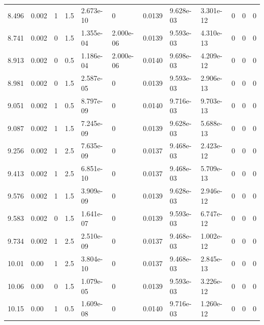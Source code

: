 \documentclass[preview]{standalone}
\begin{document}
{{{\begin{tabular}{L{1.2cm}C{1.2cm} C{0.3cm}C{0.5cm} C{1.4cm}C{1.4cm} C{1.4cm}C{1.4cm} C{1.6cm}C{1.6cm} C{1.6cm}C{1.6cm}}
  8.496  &  0.002  & 1     & 1.5 &  2.673e-10  & 0  &  0.0139&   9.628e-03& 3.301e-12 & 0   &  0 & 0  \\ 
  8.741  &  0.002  & 0     & 1.5 &  1.355e-04  & 2.000e-06  &  0.0139&   9.593e-03& 4.310e-13 & 0   &  0 & 0  \\ 
  8.913  &  0.002  & 0     & 0.5 &  1.186e-04  & 2.000e-06  &  0.0140&   9.698e-03& 4.209e-12 & 0   &  0 & 0  \\ 
  8.981  &  0.002  & 0     & 1.5 &  2.587e-05  & 0  &  0.0139&   9.593e-03& 2.906e-13 & 0   &  0 & 0  \\ 
  9.051  &  0.002  & 1     & 0.5 &  8.797e-09  & 0  &  0.0140&   9.716e-03& 9.703e-13 & 0   &  0 & 0  \\ 
  9.087  &  0.002  & 1     & 1.5 &  7.245e-09  & 0  &  0.0139&   9.628e-03& 5.688e-13 & 0   &  0 & 0  \\ 
  9.256  &  0.002  & 1     & 2.5 &  7.635e-09  & 0  &  0.0137&   9.468e-03& 2.423e-12 & 0   &  0 & 0  \\ 
  9.413  &  0.002  & 1     & 2.5 &  6.851e-10  & 0  &  0.0137&   9.468e-03& 5.709e-13 & 0   &  0 & 0  \\ 
  9.576  &  0.002  & 1     & 1.5 &  3.909e-09  & 0  &  0.0139&   9.628e-03& 2.946e-12 & 0   &  0 & 0  \\ 
  9.583  &  0.002  & 0     & 1.5 &  1.641e-07  & 0  &  0.0139&   9.593e-03& 6.747e-12 & 0   &  0 & 0  \\ 
  9.734  &  0.002  & 1     & 2.5 &  2.510e-09  & 0  &  0.0137&   9.468e-03& 1.002e-12 & 0   &  0 & 0  \\ 
  10.01  &  0.00  & 1     & 2.5 &  3.804e-10  & 0  &  0.0137&   9.468e-03& 2.845e-13 & 0   &  0 & 0  \\ 
  10.06  &  0.00  & 0     & 1.5 &  1.079e-05  & 0  &  0.0139&   9.593e-03& 3.226e-12 & 0   &  0 & 0  \\ 
  10.15  &  0.00  & 1     & 0.5 &  1.609e-08  & 0  &  0.0140&   9.716e-03& 1.260e-12 & 0   &  0 & 0  \\ 
\hline 
\end{tabular} 

}}}
\end{document}
